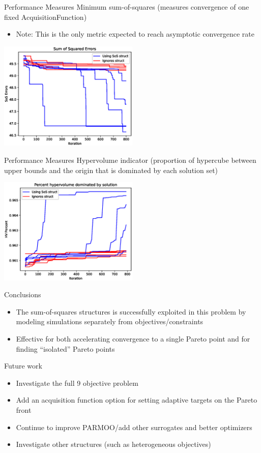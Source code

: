 \documentclass[aspectratio=169]{beamer}
\begin{document}
\begin{frame}{Performance Measures}
Minimum sum-of-squares (measures convergence of one fixed AcquisitionFunction)
\begin{itemize}
\item Note: This is the only metric expected to reach asymptotic convergence
rate
\end{itemize}
\begin{center}
\includegraphics[width=0.5\textwidth]{sos_error.eps}
\end{center}
\end{frame}

\begin{frame}{Performance Measures}
Hypervolume indicator (proportion of hypercube between upper bounds
and the origin that is dominated by each solution set)
\begin{center}
\includegraphics[width=0.5\textwidth]{hv_1.eps}
\end{center}
\end{frame}

\begin{frame}{Conclusions}
\begin{itemize}
\item The sum-of-squares structures is successfully exploited in this problem
by modeling simulations separately from objectives/constraints
\item Effective for both accelerating convergence to a single Pareto point
and for finding ``isolated'' Pareto points
\end{itemize}
\pause
Future work
\begin{itemize}
\item Investigate the full 9 objective problem
\item Add an acquisition function option for setting adaptive targets on the
Pareto front
\item Continue to improve PARMOO/add other surrogates and better optimizers
\item Investigate other structures (such as heterogeneous objectives)
\end{itemize}
\end{frame}
\end{document}
